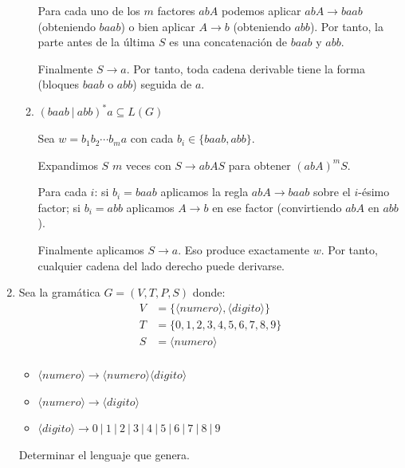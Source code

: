 \documentclass[12pt]{book} %
\begin{document}
\begin{enumerate}
\begin{solucion}[Ejercicio 2.a]
\begin{enumerate}
               Para cada uno de los $m$ factores $abA$ podemos aplicar $abA \to baab$ (obteniendo $baab$) o bien aplicar $A \to b$ (obteniendo $abb$). Por tanto, la parte antes de la última $S$ es una concatenación de $baab$ y $abb$.

               Finalmente $S \to a$. Por tanto, toda cadena derivable tiene la forma (bloques $baab$ o $abb$) seguida de $a$.

           \item $(baab \ | \ abb)^* a \subseteq L(G)$

               Sea $w = b_1b_2\cdots b_ma$ con cada $b_i \in \{baab, abb\}$.

               Expandimos $S$ $m$ veces con $S \to abAS$ para obtener $(abA)^mS$.

               Para cada $i$: si $b_i = baab$ aplicamos la regla $abA \to baab$ sobre el $i$-ésimo factor; si $b_i = abb$ aplicamos $A \to b$ en ese factor (convirtiendo $abA$ en $abb$).

               Finalmente aplicamos $S \to a$. Eso produce exactamente $w$. Por tanto, cualquier cadena del lado derecho puede derivarse.
       \end{enumerate}

   \end{solucion}
\item
  Sea la gramática \(G = (V, T, P, S)\) donde:\\
  \begin{align*}
   V &= \{\langle numero \rangle, \langle digito \rangle\} \\
   T &= \{0, 1, 2, 3, 4, 5, 6, 7, 8, 9\} \\
   S &= \langle numero \rangle \\
   \end{align*}

  \begin{itemize}
       \item $\langle numero \rangle \to \langle numero \rangle \langle digito \rangle$
       \item $\langle numero \rangle \to \langle digito \rangle$
       \item $\langle digito \rangle \to 0 \ | \ 1 \ | \ 2 \ | \ 3 \ | \ 4 \ | \ 5 \ | \ 6 \ | \ 7 \ | \ 8 \ | \ 9$
   \end{itemize}

  Determinar el lenguaje que genera.

  \begin{solucion}[Ejercicio 2.b]


\end{solucion}
\end{enumerate}
\end{document}
